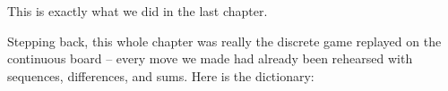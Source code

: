 This is exactly what we did in the last chapter.

Stepping back, this whole chapter was really the discrete game replayed on the
continuous board -- every move we made had already been rehearsed with sequences,
differences, and sums. Here is the dictionary:
\bigskip
\centerline{\vbox{}}
\bigskip


